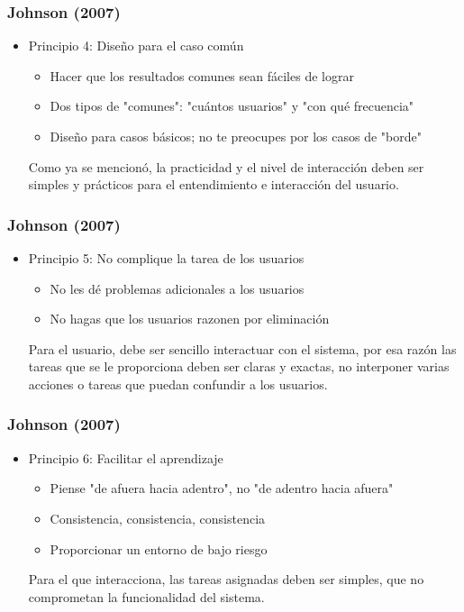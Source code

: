 \documentclass[11pt]{beamer}
\begin{document}
\begin{frame}
\frametitle{Johnson (2007)}
\begin{itemize}
\color{red}
\item Principio 4: Diseño para el caso común
    \par
    \justify
    \color{black}
    \begin{itemize}
    \item Hacer que los resultados comunes sean fáciles de lograr
	\item Dos tipos de "comunes": "cuántos usuarios" y "con qué frecuencia"
	\item Diseño para casos básicos; no te preocupes por los casos de "borde"
    \end{itemize}
    \par
     Como ya se mencionó, la practicidad y el nivel de interacción deben ser simples y prácticos para el entendimiento e interacción del usuario.
\end{itemize}
\end{frame}

\begin{frame}
\frametitle{Johnson (2007)}
\begin{itemize}
\color{red}
\item Principio 5: No complique la tarea de los usuarios
    \par
    \justify
    \color{black}
    \begin{itemize}
    \item No les dé problemas adicionales a los usuarios
	\item No hagas que los usuarios razonen por eliminación
    \end{itemize}
    \par
    Para el usuario, debe ser sencillo interactuar con el sistema, por esa razón las tareas que se le proporciona deben ser claras y exactas, no interponer varias acciones o tareas que puedan confundir a los usuarios.
\end{itemize}
\end{frame}

\begin{frame}
\frametitle{Johnson (2007)}
\begin{itemize}
\color{red}
\item Principio 6: Facilitar el aprendizaje
    \par
    \justify
    \color{black}
    \begin{itemize}
    \item Piense "de afuera hacia adentro", no "de adentro hacia afuera"
	\item Consistencia, consistencia, consistencia 
	\item Proporcionar un entorno de bajo riesgo
    \end{itemize}
    \par
    Para el que interacciona, las tareas asignadas deben ser simples, que no comprometan la funcionalidad del sistema.
\end{itemize}
\end{frame}
\end{document}
